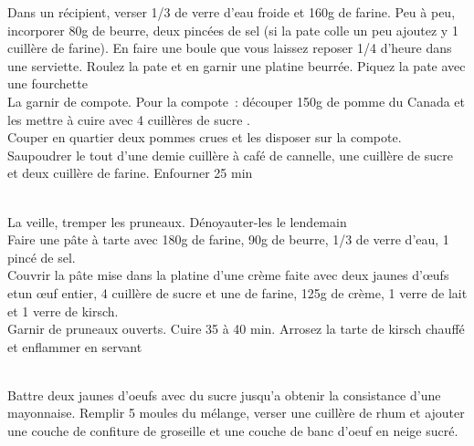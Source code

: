 \begin{minipage}[c]{\textwidth}
Dans un récipient, verser 1/3 de verre d'eau froide et 160g de farine. Peu à peu, incorporer 80g de beurre, deux pincées de sel (si la pate colle un peu ajoutez y 1 cuillère de farine). En faire une boule que vous laissez reposer 1/4 d'heure dans une serviette. Roulez la pate et en garnir une platine beurrée. Piquez la pate avec une fourchette\\
La garnir de compote. Pour la compote : découper 150g de pomme du Canada et les mettre à cuire avec 4 cuillères de sucre .\\
Couper en quartier deux pommes crues et les disposer sur la compote.\\
Saupoudrer le tout d'une demie cuillère à café de cannelle, une cuillère de sucre et deux cuillère de farine. Enfourner 25 min\\
\\

\end{minipage}

\begin{minipage}[c]{\textwidth}
La veille, tremper les pruneaux. Dénoyauter-les le lendemain\\
Faire une pâte à tarte avec 180g de farine, 90g de beurre, 1/3 de verre d'eau, 1 pincé de sel.\\
Couvrir la pâte mise dans la platine d'une crème faite avec deux jaunes d’œufs etun œuf entier, 4 cuillère de sucre et une de farine, 125g de crème, 1 verre de lait et 1 verre de kirsch.\\
Garnir de pruneaux ouverts. Cuire 35 à 40 min. Arrosez la tarte de kirsch chauffé et enflammer en servant\\
\\

\end{minipage}

\begin{minipage}[c]{\textwidth}
Battre deux jaunes d'oeufs avec du sucre jusqu'a obtenir la consistance d'une mayonnaise. Remplir 5 moules du mélange, verser une cuillère de rhum et ajouter une couche de confiture de groseille et une couche de banc d'oeuf en neige sucré.\\
\\

\end{minipage}

